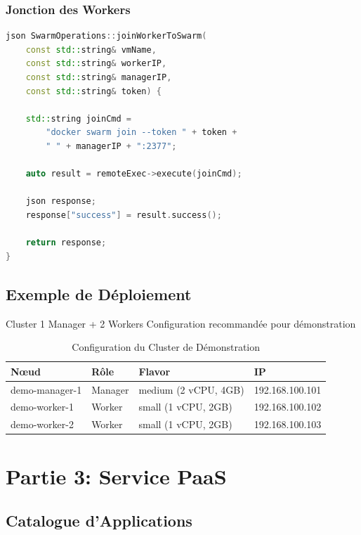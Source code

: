 \documentclass[12pt,a4paper]{article}
\begin{document}
\subsubsection{Jonction des Workers}

\begin{lstlisting}[language=C++, caption=Ajout de worker au cluster]
json SwarmOperations::joinWorkerToSwarm(
    const std::string& vmName,
    const std::string& workerIP,
    const std::string& managerIP,
    const std::string& token) {
    
    std::string joinCmd = 
        "docker swarm join --token " + token + 
        " " + managerIP + ":2377";
    
    auto result = remoteExec->execute(joinCmd);
    
    json response;
    response["success"] = result.success();
    
    return response;
}
\end{lstlisting}

\subsection{Exemple de Déploiement}

\begin{successbox}{Cluster 1 Manager + 2 Workers}
Configuration recommandée pour démonstration
\end{successbox}

\begin{table}[H]
\centering
\begin{tabular}{@{}llll@{}}
\toprule
\textbf{Nœud} & \textbf{Rôle} & \textbf{Flavor} & \textbf{IP} \\
\midrule
demo-manager-1 & Manager & medium (2 vCPU, 4GB) & 192.168.100.101 \\
demo-worker-1 & Worker & small (1 vCPU, 2GB) & 192.168.100.102 \\
demo-worker-2 & Worker & small (1 vCPU, 2GB) & 192.168.100.103 \\
\bottomrule
\end{tabular}
\caption{Configuration du Cluster de Démonstration}
\end{table}

\section{Partie 3: Service PaaS}

\subsection{Catalogue d'Applications}
\end{document}
